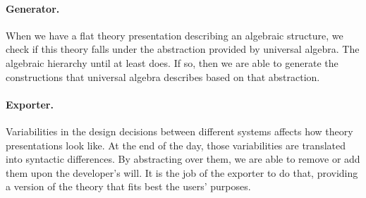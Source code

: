 \paragraph{Generator.} When we have a flat theory presentation describing an algebraic structure, we check if this theory falls under the abstraction provided by universal algebra. The algebraic hierarchy until at least  does. If so, then we are able to generate the constructions that universal algebra describes based on that abstraction. 

\paragraph{Exporter.} Variabilities in the design decisions between different systems affects how theory presentations look like. At the end of the day, those variabilities are translated into syntactic differences. By abstracting over them, we are able to remove or add them upon the developer's will. It is the job of the exporter to do that, providing a version of the theory that fits best the users' purposes. 



